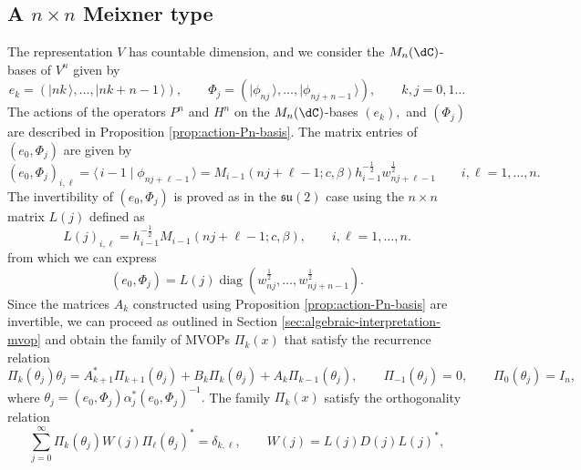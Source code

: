 \documentclass[a4paper,reqno]{amsart}
\DeclareMathOperator{\diag}{diag}
\theoremstyle{definition}
\numberwithin{equation}{section}
\newcommand{\bra}[1]{\langle\,{#1}}
\newcommand{\ket}[1]{\mid{#1}\,\rangle}
\begin{document}

\subsection{A $n\times n$ Meixner type} 
\label{sec:nxn-example-meixner}

The representation $V$ has countable dimension, and we consider the $M_n(\dC)$-bases of $V^n$ given by
\begin{equation}
    e_k=(\ket{nk},\ldots,\ket{nk+n-1}), \qquad \Phi_j=(\ket{\phi_{nj}}, \ldots, \ket{\phi_{nj+n-1}}), \qquad  k,j=0,1\ldots
\end{equation}
The actions of the operators $P^n$ and $H^n$ on the $M_n(\dC)$-bases $(e_k),$ and $(\Phi_j)$ are described in Proposition \ref{prop:action-Pn-basis}. 
The matrix entries of $(e_0,\Phi_j)$ are given by 
\begin{equation}
    (e_0,\Phi_j)_{i,\ell}=\bra{i-1}\ket{\phi_{nj+\ell-1}} = M_{i-1}(nj+\ell-1;c,\beta)h_{i-1}^{-\frac{1}{2}}w_{nj+\ell-1}^\frac12 \qquad i,\ell=1,\ldots, n. 
\end{equation}
The invertibility of $(e_0,\Phi_j)$ is proved as in the $\mathfrak{su}(2)$ case using the $n\times n$ matrix $L(j)$ defined as
\begin{equation}
\label{eq:alternant-meixner}
L(j)_{i,\ell}=h_{i-1}^{-\frac{1}{2}}M_{i-1}(nj+\ell-1;c,\beta), \qquad i,\ell=1,\ldots, n.
\end{equation}
from which we can express
\begin{equation}
(e_0,\Phi_j)=L(j)\diag(w_{nj}^\frac12,\ldots,w_{nj+n-1}^\frac12).
\end{equation} 
Since the matrices $A_k$ constructed using Proposition \ref{prop:action-Pn-basis} are invertible, we can proceed as outlined in Section \ref{sec:algebraic-interpretation-mvop} and obtain the family of MVOPs $\Pi_k(x)$ that satisfy the recurrence relation 
 \begin{equation}
\Pi_k(\theta_j)\theta_j=A_{k+1}^*\Pi_{k+1}(\theta_j)+B_k\Pi_k(\theta_j)+A_k\Pi_{k-1}(\theta_j), \qquad 
\Pi_{-1}(\theta_j)=0,\qquad \Pi_0(\theta_j)=I_n,
 \end{equation}
 where $\theta_j=( e_0, \Phi_j) \alpha_j^*( e_0, \Phi_j)^{-1}.$ The family $\Pi_k(x)$ satisfy the orthogonality relation
\begin{equation}
\label{eq:orth-meixner-nxn}
\sum_{j=0}^\infty \Pi_{k}(\theta_j)W(j)\Pi_{\ell}(\theta_j)^\ast=\delta_{k,\ell},\qquad W(j)=L(j)D(j)L(j)^\ast,
\end{equation} 
\end{document}
